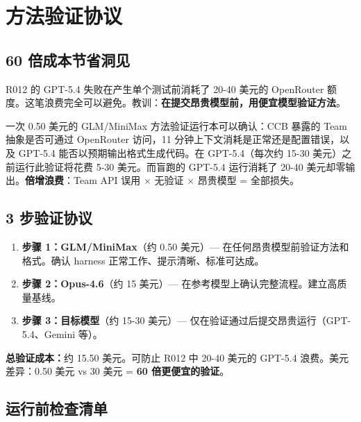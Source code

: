 \documentclass[11pt, a4paper]{article}
\begin{document}
\section{方法验证协议}

\subsection{60 倍成本节省洞见}

R012 的 GPT-5.4 失败在产生单个测试前消耗了 20-40 美元的 OpenRouter 额度。这笔浪费完全可以避免。教训：\textbf{在提交昂贵模型前，用便宜模型验证方法}。

\begin{evidence}
一次 0.50 美元的 GLM/MiniMax 方法验证运行本可以确认：CCB 暴露的 Team 抽象是否可通过 OpenRouter 访问，11 分钟上下文消耗是正常还是配置错误，以及 GPT-5.4 能否以预期输出格式生成代码。在 GPT-5.4（每次约 15-30 美元）之前运行此验证将花费 5-30 美元。而盲跑的 GPT-5.4 运行消耗了 20-40 美元却零输出。\textbf{倍增浪费}：Team API 误用 $\times$ 无验证 $\times$ 昂贵模型 = 全部损失。
\end{evidence}

\subsection{3 步验证协议}

\begin{enumerate}
  \item \textbf{步骤 1：GLM/MiniMax}（约 0.50 美元）--- 在任何昂贵模型前验证方法和格式。确认 harness 正常工作、提示清晰、标准可达成。
  \item \textbf{步骤 2：Opus-4.6}（约 15 美元）--- 在参考模型上确认完整流程。建立高质量基线。
  \item \textbf{步骤 3：目标模型}（约 15-30 美元）--- 仅在验证通过后提交昂贵运行（GPT-5.4、Gemini 等）。
\end{enumerate}

\textbf{总验证成本：}约 15.50 美元。可防止 R012 中 20-40 美元的 GPT-5.4 浪费。美元差异：0.50 美元 vs 30 美元 = \textbf{60 倍更便宜的验证}。

\subsection{运行前检查清单}
\end{document}
